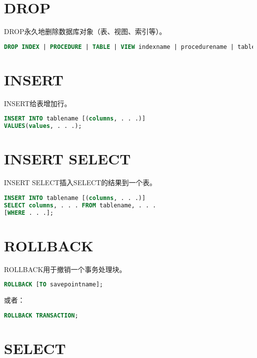 \section{DROP}

DROP永久地删除数据库对象（表、视图、索引等）。

\begin{lstlisting}[language=SQL]
DROP INDEX | PROCEDURE | TABLE | VIEW indexname | procedurename | tablename | viewname;
\end{lstlisting}

\section{INSERT}

INSERT给表增加行。

\begin{lstlisting}[language=SQL]
INSERT INTO tablename [(columns, . . .)]
VALUES(values, . . .);
\end{lstlisting}

\section{INSERT SELECT}

INSERT SELECT插入SELECT的结果到一个表。

\begin{lstlisting}[language=SQL]
INSERT INTO tablename [(columns, . . .)]
SELECT columns, . . . FROM tablename, . . .
[WHERE . . .];
\end{lstlisting}


\section{ROLLBACK}


ROLLBACK用于撤销一个事务处理块。

\begin{lstlisting}[language=SQL]
ROLLBACK [TO savepointname];
\end{lstlisting}

或者：

\begin{lstlisting}[language=SQL]
ROLLBACK TRANSACTION;
\end{lstlisting}


\section{SELECT}

